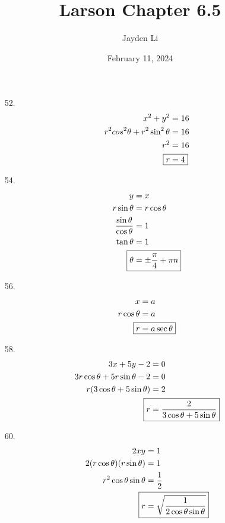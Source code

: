 \documentclass{article}
\title{Larson Chapter 6.5}
\author{Jayden Li}
\date{February 11, 2024}
\begin{document}
\setlength{\abovedisplayskip}{0pt}
\fontsize{12pt}{12pt}\selectfont
\maketitle

\begin{multicols}{2}
	\begin{itemize}
	\item[52.]
		\begin{align*}
			x^2+y^2&=16 \\
			r^2cos^2\theta+r^2\sin^2\theta&=16 \\
			r^2&=16 \\
			\Aboxed{r&=4}
		\end{align*}

	\item[54.]
		\begin{align*}
			y&=x \\
			r\sin\theta&=r\cos\theta \\
			\frac{\sin\theta}{\cos\theta}&=1 \\
			\tan\theta&=1 \\
			\Aboxed{\theta&=\pm\frac{\pi}{4}+\pi n}
		\end{align*}

	\item[56.]
		\begin{align*}
			x&=a \\
			r\cos\theta&=a \\
			\Aboxed{r&=a\sec\theta}
		\end{align*}

	\item[58.]
		\begin{align*}
			3x+5y-2&=0 \\
			3r\cos\theta+5r\sin\theta-2&=0 \\
			r(3\cos\theta+5\sin\theta)&=2 \\
			\Aboxed{r&=\frac{2}{3\cos\theta+5\sin\theta}}
		\end{align*}

	\item[60.]
		\begin{align*}
			2xy&=1 \\
			2(r\cos\theta)(r\sin\theta)&=1 \\
			r^2\cos\theta\sin\theta&=\frac{1}{2} \\
			\Aboxed{r&=\sqrt{\frac{1}{2\cos\theta\sin\theta}}}
		\end{align*}


\end{itemize}
\end{multicols}
\end{document}
